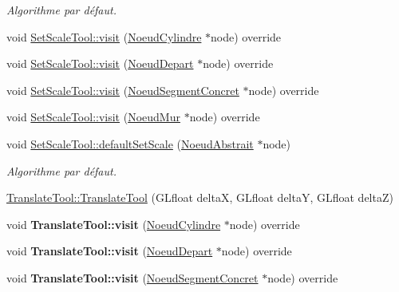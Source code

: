\begin{DoxyCompactItemize}
\begin{DoxyCompactList}\small\item\em Algorithme par défaut. \end{DoxyCompactList}\item 
void \hyperlink{group__inf2990_gae12ec27e420078166d0f1fbce51ea3c1}{Set\-Scale\-Tool\-::visit} (\hyperlink{class_noeud_cylindre}{Noeud\-Cylindre} $\ast$node) override
\item 
void \hyperlink{group__inf2990_ga372ff3eab42997c84eb768fdf72a5dcc}{Set\-Scale\-Tool\-::visit} (\hyperlink{class_noeud_depart}{Noeud\-Depart} $\ast$node) override
\item 
void \hyperlink{group__inf2990_ga3f0a73ab0f183d9d4e3a6820442f17a2}{Set\-Scale\-Tool\-::visit} (\hyperlink{class_noeud_segment_concret}{Noeud\-Segment\-Concret} $\ast$node) override
\item 
void \hyperlink{group__inf2990_ga51cfb7f08b02858b45b2beb9e51a8dce}{Set\-Scale\-Tool\-::visit} (\hyperlink{class_noeud_mur}{Noeud\-Mur} $\ast$node) override
\item 
void \hyperlink{group__inf2990_ga589b51975cc03cea1752747ef558a45d}{Set\-Scale\-Tool\-::default\-Set\-Scale} (\hyperlink{class_noeud_abstrait}{Noeud\-Abstrait} $\ast$node)
\begin{DoxyCompactList}\small\item\em Algorithme par défaut. \end{DoxyCompactList}\item 
\hyperlink{group__inf2990_ga48e1c155fef64a5a07991df870721ae6}{Translate\-Tool\-::\-Translate\-Tool} (G\-Lfloat delta\-X, G\-Lfloat delta\-Y, G\-Lfloat delta\-Z)
\item 
\hypertarget{group__inf2990_ga64811cbd57db1cb725dc0d472c8f5ab1}{void {\bfseries Translate\-Tool\-::visit} (\hyperlink{class_noeud_cylindre}{Noeud\-Cylindre} $\ast$node) override}\label{group__inf2990_ga64811cbd57db1cb725dc0d472c8f5ab1}

\item 
\hypertarget{group__inf2990_gab0781475ac48f2dcb8610bfee475aba3}{void {\bfseries Translate\-Tool\-::visit} (\hyperlink{class_noeud_depart}{Noeud\-Depart} $\ast$node) override}\label{group__inf2990_gab0781475ac48f2dcb8610bfee475aba3}

\item 
\hypertarget{group__inf2990_ga3533e88b9fcc0f815cccb9e33773d756}{void {\bfseries Translate\-Tool\-::visit} (\hyperlink{class_noeud_segment_concret}{Noeud\-Segment\-Concret} $\ast$node) override}\label{group__inf2990_ga3533e88b9fcc0f815cccb9e33773d756}


\end{DoxyCompactItemize}
